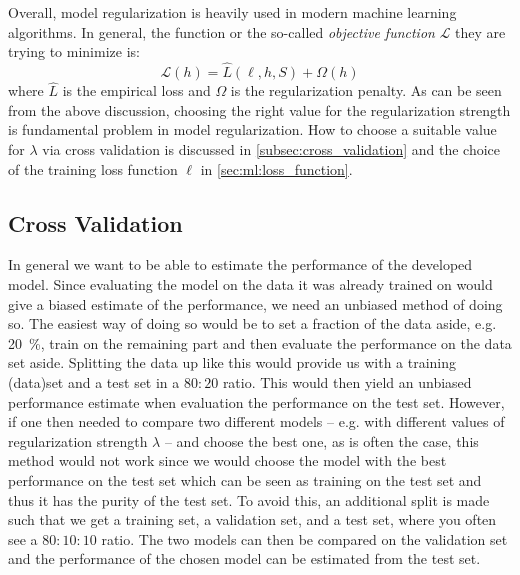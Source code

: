 Overall, model regularization is heavily used in modern machine learning algorithms. In general, the function or the so-called \emph{objective function} $\mathcal{L}$ they are trying to minimize is:
\begin{equation}
  \mathcal{L}(h) = \hat{L}(\ell, h, S) + \Omega(h)
\end{equation}
where $\hat{L}$ is the empirical loss and $\Omega$ is the regularization penalty. As can be seen from the above discussion, choosing the right value for the regularization strength is fundamental problem in model regularization. How to choose a suitable value for $\lambda$ via cross validation is discussed in \autoref{subsec:cross_validation} and the choice of the training loss function $\ell$ in \autoref{sec:ml:loss_function}. 

\subsection{Cross Validation}
\label{subsec:cross_validation}
In general we want to  be able to estimate the performance of the developed model. Since evaluating the model on the data it was already trained on would give a biased estimate of the performance, we need an unbiased method of doing so. The easiest way of doing so would be to set a fraction of the data aside, e.g. \SI{20}{\percent}, train on the remaining part and then evaluate the performance on the data set aside. Splitting the data up like this would provide us with a training (data)set and a test set in a $\num{80}:\num{20}$ ratio. This would then yield an unbiased performance estimate when evaluation the performance on the test set. 
However, if one then needed to compare two different models -- e.g. with different values of regularization strength $\lambda$ -- and choose the best one, as is often the case, this method would not work since we would choose the model with the best performance on the test set which can be seen as training on the test set and thus it has  the purity of the test set. To avoid this, an additional split is made such that we get a training set, a validation set, and a test set, where you often see a $\num{80}:\num{10}:\num{10}$ ratio. The two models can then be compared on the validation set and the performance of the chosen model can be estimated from the test set. 

